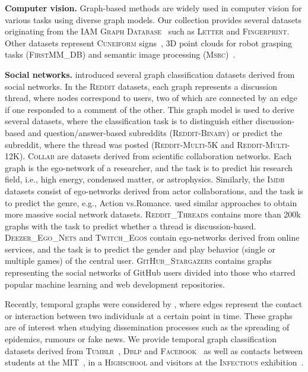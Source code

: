 \documentclass{article}
\newcommand{\xhdr}[1]{{\noindent\bfseries #1}}
\theoremstyle{definition}
\begin{document}
\xhdr{Computer vision.}
Graph-based methods are widely used in computer vision for various tasks using diverse graph models. Our collection provides several datasets originating from the \textsc{IAM Graph Database}~\citep{Riesen2008} such as \textsc{Letter} and \textsc{Fingerprint}. Other datasets represent \textsc{Cuneiform} signs~\citep{Kriege2018}, 3D point clouds for robot grasping tasks (\textsc{FirstMM\_DB}) and semantic image processing (\textsc{Msrc})~\cite{Neu+2016}.

\xhdr{Social networks.}
\citet{Yan+2015a} introduced several graph classification datasets derived from social networks. In the \textsc{Reddit} datasets, each graph represents a discussion thread, where nodes correspond to users, two of which are connected by an edge if one responded to a comment of the other. This graph model is used to derive several datasets, where the classification task is to distinguish either discussion-based and question/answer-based subreddits (\textsc{Reddit-Binary}) or predict the subreddit, where the thread was posted (\textsc{Reddit-Multi-5K} and \textsc{Reddit-Multi-12K}). \textsc{Collab} are datasets derived from scientific collaboration networks. Each graph is the ego-network of a researcher, and the task is to predict his research field, i.e., high energy, condensed matter, or astrophysics. Similarly, the \textsc{Imdb} datasets consist of ego-networks derived from actor collaborations, and the task is to predict the genre, e.g.,  Action vs.\@ Romance.
\citet{Rozemberczki2020} used similar approaches to obtain more massive social network datasets. \textsc{Reddit\_Threads} contains more than 200k graphs with the task to predict whether a thread is discussion-based. \textsc{Deezer\_Ego\_Nets} and \textsc{Twitch\_Egos} contain ego-networks derived from online services, and the task is to predict the gender and play behavior (single or multiple games) of the central user.
\textsc{GitHub\_Stargazers} contains graphs representing the social networks of GitHub users divided into those who starred popular machine learning and web development repositories.


Recently, temporal graphs were considered by \citet{Oettershagen2019}, where edges represent the contact or interaction between two individuals at a certain point in time. These graphs are of interest when studying dissemination processes such as the spreading of epidemics, rumours or fake news. We provide temporal graph classification datasets derived from \textsc{Tumblr}~\citep{rozenshtein2016reconstructing}, \textsc{Dblp} and \textsc{Facebook}~\citep{viswanath2009evolution} as well as contacts between students at the \textsc{MIT}~\cite{konect:eagle06}, in a \textsc{Highschool} and visitors at the \textsc{Infectious} exhibition~\citep{Isella2011}.
\end{document}

